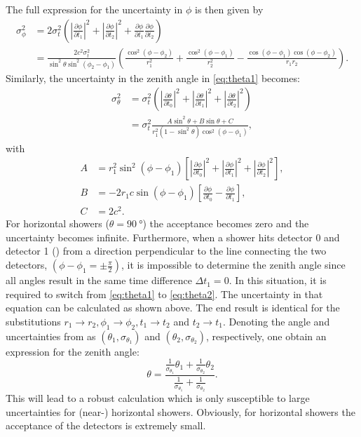 The full expression for the uncertainty in $\phi$ is then given by
\begin{equation}
\begin{split}
\label{eq:errphi}
\sigma_\phi^2 &= 2 \sigma_t^2 \left(\left|\frac{\partial\phi}{\partial t_1}\right|^2 + \left|\frac{\partial\phi}{\partial t_2}\right|^2 + \frac{\partial\phi}{\partial t_1}\frac{\partial\phi}{\partial t_2} \right) \\
&= \frac{2c^2\sigma_t^2}{\sin^2\theta\sin^2(\phi_2 - \phi_1)} \left( \frac{\cos^2(\phi - \phi_2)}{r_1^2} + \frac{\cos^2(\phi - \phi_1)}{r_2^2} - \frac{\cos(\phi - \phi_1)\cos(\phi - \phi_2)}{r_1r_2} \right).
\end{split}
\end{equation}
%
Similarly, the uncertainty in the zenith angle in \eqref{eq:theta1} becomes:
\begin{equation}
\label{eq:errtheta}
\begin{split}
\sigma_\theta^2 &= \sigma_t^2 \left(\left|\frac{\partial\theta}{\partial t_0}\right|^2 + \left|\frac{\partial\theta}{\partial t_1}\right|^2 + \left|\frac{\partial\theta}{\partial t_2}\right|^2\right) \\
&= \sigma_t^2 \frac{A\sin^2\theta + B\sin\theta + C}{r_1^2(1 - \sin^2\theta)\cos^2(\phi - \phi_1)},
\end{split}
\end{equation}
with
\begin{align}
A &= r_1^2\sin^2(\phi - \phi_1) \left[\left|\frac{\partial\phi}{\partial t_0}\right|^2 + \left|\frac{\partial\phi}{\partial t_1}\right|^2 + \left|\frac{\partial\phi}{\partial t_2}\right|^2\right] ,\\
B &= -2r_1 c \sin(\phi - \phi_1) \left[\frac{\partial\phi}{\partial t_0} - \frac{\partial\phi}{\partial t_1}\right] ,\\
C &= 2c^2 .
\end{align}
%
For horizontal showers ($\theta = \SI{90}{\degree}$) the acceptance becomes zero
and the uncertainty becomes infinite.  Furthermore, when a shower hits detector
0 and detector 1 () from a direction
perpendicular to the line connecting the two detectors, $\left(\phi - \phi_1 =
\pm\frac{\pi}{2}\right)$, it is impossible to determine the zenith angle since all
angles result in the same time difference $\Delta t_1 = 0$.  In this situation,
it is required to switch from \eqref{eq:theta1} to \eqref{eq:theta2}.  The
uncertainty in that equation can be calculated as shown above.  The end result
is identical for the substitutions $r_1 \to r_2, \phi_1 \to \phi_2, t_1 \to t_2$
and $t_2 \to t_1$.  Denoting the angle and uncertainties from
 as $(\theta_1, \sigma_{\theta_1})$ and $(\theta_2,
\sigma_{\theta_2})$, respectively, one obtain an expression for the zenith
angle:
\begin{equation}
\theta = \frac{\frac{1}{\sigma_{\theta_1}} \theta_1 + \frac{1}{\sigma_{\theta_2}} \theta_2}{\frac{1}{\sigma_{\theta_1}} + \frac{1}{\sigma_{\theta_2}}}.
\end{equation}
This will lead to a robust calculation which is only susceptible to large uncertainties
for (near-) horizontal showers. Obviously, for horizontal showers the acceptance
of the detectors is extremely small.


